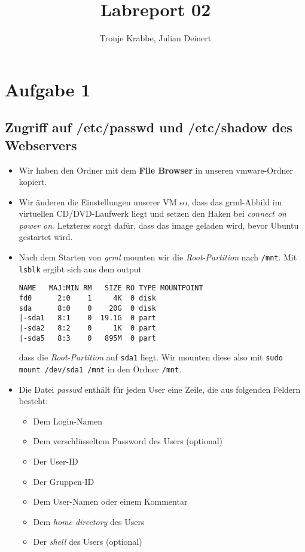 \documentclass[12pt,a4paper]{article}
\author{Tronje Krabbe, Julian Deinert}
\title{Labreport 02}
\begin{document}
\maketitle
\tableofcontents
\newpage


\section*{Aufgabe 1}
\subsection{Zugriff auf /etc/passwd und /etc/shadow des Webservers}
\begin{itemize}
\item Wir haben den Ordner mit dem \textbf{File Browser} in unseren vmware-Ordner kopiert.
\item Wir änderen die Einstellungen unserer VM so, dass das grml-Abbild im virtuellen CD/DVD-Laufwerk liegt und setzen den Haken bei \textit{connect on power on}. Letzteres sorgt dafür, dass das image geladen wird, bevor Ubuntu gestartet wird.
\item Nach dem Starten von \textit{grml} mounten wir die \textit{Root-Partition} nach \texttt{/mnt}. Mit \texttt{lsblk} ergibt sich aus dem output
\begin{verbatim}
NAME   MAJ:MIN RM   SIZE RO TYPE MOUNTPOINT
fd0      2:0    1     4K  0 disk
sda      8:0    0    20G  0 disk 
|-sda1   8:1    0  19.1G  0 part 
|-sda2   8:2    0     1K  0 part 
|-sda5   8:3    0   895M  0 part

\end{verbatim}
dass die \textit{Root-Partition} auf \texttt{sda1} liegt.
Wir mounten diese also mit \texttt{sudo mount /dev/sda1 /mnt} in den Ordner \texttt{/mnt}.

\item Die Datei \textit{passwd} enthält für jeden User eine Zeile, die aus folgenden Feldern besteht:
\begin{itemize}
\item Dem Login-Namen
\item Dem verschlüsseltem Password des Users (optional)
\item Der User-ID
\item Der Gruppen-ID
\item Dem User-Namen oder einem Kommentar
\item Dem \textit{home directory} des Users
\item Der \textit{shell} des Users (optional)


\end{itemize}
\end{itemize}
\end{document}
